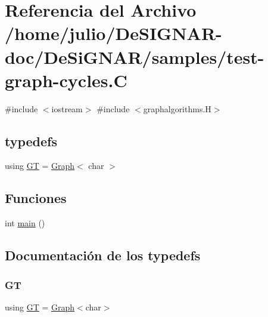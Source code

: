 \hypertarget{test-graph-cycles_8_c}{}\section{Referencia del Archivo /home/julio/\+De\+S\+I\+G\+N\+A\+R-\/doc/\+De\+Si\+G\+N\+A\+R/samples/test-\/graph-\/cycles.C}
\label{test-graph-cycles_8_c}
{\ttfamily \#include $<$iostream$>$}\newline
{\ttfamily \#include $<$graphalgorithms.\+H$>$}\newline
\subsection*{typedefs}
\begin{DoxyCompactItemize}
\item 
using \hyperlink{test-graph-cycles_8_c_a867adda87f9db275997db57644adc40f}{GT} = \hyperlink{class_designar_1_1_graph}{Graph}$<$ char $>$
\end{DoxyCompactItemize}
\subsection*{Funciones}
\begin{DoxyCompactItemize}
\item 
int \hyperlink{test-graph-cycles_8_c_ae66f6b31b5ad750f1fe042a706a4e3d4}{main} ()
\end{DoxyCompactItemize}


\subsection{Documentación de los \textquotesingle{}typedefs\textquotesingle{}}
\mbox{\label{test-graph-cycles_8_c_a867adda87f9db275997db57644adc40f}} 
\subsubsection{\texorpdfstring{GT}{GT}}
{\footnotesize\ttfamily using \hyperlink{demo-buildgraph_8_c_a3001c40d2c31ca87ed96cd7d1334a55e}{GT} =  \hyperlink{class_designar_1_1_graph}{Graph}$<$char$>$}



